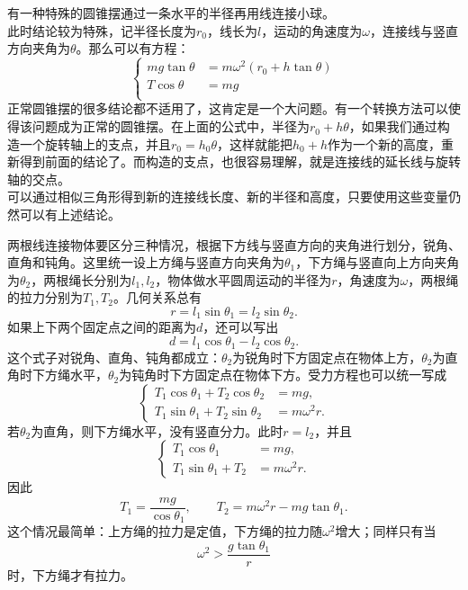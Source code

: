 \begin{casetypebox}[title={\strut\textcolor{white}{\bfseries 常见题型：等效圆锥摆}}]
  有一种特殊的圆锥摆通过一条水平的半径再用线连接小球。\\
  此时结论较为特殊，记半径长度为$r_0$，线长为$l$，运动的角速度为$\omega$，连接线与竖直方向夹角为$\theta$。那么可以有方程：
  \[\left\{
    \begin{aligned}
      mg\tan\theta & =m\omega^2(r_0+h\tan\theta) \\
      T\cos\theta& =mg \\
    \end{aligned}\right.\]
  正常圆锥摆的很多结论都不适用了，这肯定是一个大问题。有一个转换方法可以使得该问题成为正常的圆锥摆。在上面的公式中，半径为$r_0+h\theta$，如果我们通过构造一个旋转轴上的支点，并且$r_0=h_0\theta$，这样就能把$h_0+h$作为一个新的高度，重新得到前面的结论了。而构造的支点，也很容易理解，就是连接线的延长线与旋转轴的交点。\\
  可以通过相似三角形得到新的连接线长度、新的半径和高度，只要使用这些变量仍然可以有上述结论。
\end{casetypebox}
\begin{casetypebox}[title={\strut\textcolor{white}{\bfseries 常见题型：竖直平面两根绳吊着物体}}]
  两根线连接物体要区分三种情况，根据下方线与竖直方向的夹角进行划分，锐角、直角和钝角。这里统一设上方绳与竖直方向夹角为$\theta_1$，下方绳与竖直向上方向夹角为$\theta_2$，两根绳长分别为$l_1,l_2$，物体做水平圆周运动的半径为$r$，角速度为$\omega$，两根绳的拉力分别为$T_1,T_2$。几何关系总有
  \[
    r=l_1\sin\theta_1=l_2\sin\theta_2.
  \]
  如果上下两个固定点之间的距离为$d$，还可以写出
  \[
    d=l_1\cos\theta_1-l_2\cos\theta_2.
  \]
  这个式子对锐角、直角、钝角都成立：$\theta_2$为锐角时下方固定点在物体上方，$\theta_2$为直角时下方绳水平，$\theta_2$为钝角时下方固定点在物体下方。受力方程也可以统一写成
  \[
    \left\{
    \begin{aligned}
      T_1\cos\theta_1+T_2\cos\theta_2 & =mg, \\
      T_1\sin\theta_1+T_2\sin\theta_2 & =m\omega^2r.
    \end{aligned}\right.
  \]
  若$\theta_2$为直角，则下方绳水平，没有竖直分力。此时$r=l_2$，并且
  \[
    \left\{
    \begin{aligned}
      T_1\cos\theta_1 & =mg, \\
      T_1\sin\theta_1+T_2 & =m\omega^2r.
    \end{aligned}\right.
  \]
  因此
  \[
    T_1=\frac{mg}{\cos\theta_1},\qquad
    T_2=m\omega^2r-mg\tan\theta_1.
  \]
  这个情况最简单：上方绳的拉力是定值，下方绳的拉力随$\omega^2$增大；同样只有当
  \[
    \omega^2>\frac{g\tan\theta_1}{r}
  \]
  时，下方绳才有拉力。\\
\end{casetypebox}

